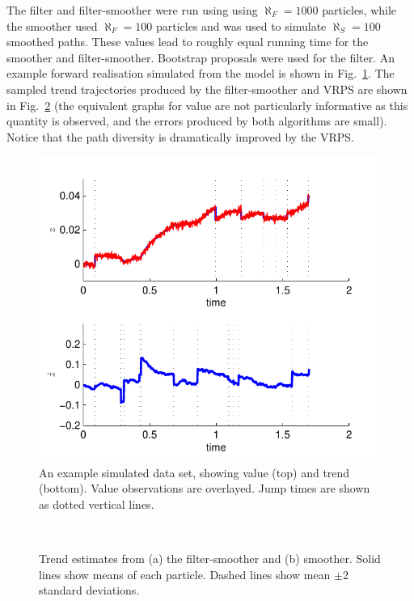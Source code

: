 \documentclass[peerreview,11pt,draftcls,onecolumn]{IEEEtran}
\begin{document}
The filter and filter-smoother were run using using $\aleph_F = 1000$ particles, while the smoother used $\aleph_F = 100$ particles and was used to simulate $\aleph_S = 100$ smoothed paths. These values lead to roughly equal running time for the smoother and filter-smoother. Bootstrap proposals were used for the filter. An example forward realisation simulated from the model is shown in Fig.~\ref{fig:example_data}. The sampled trend trajectories produced by the filter-smoother and VRPS are shown in Fig.~\ref{fig:example_state} (the equivalent graphs for value are not particularly informative as this quantity is observed, and the errors produced by both algorithms are small). Notice that the path diversity is dramatically improved by the VRPS.
%
\begin{figure}[!t]
\centering
\includegraphics[width=0.45\columnwidth]{example_data.pdf}
\caption{An example simulated data set, showing value (top) and trend (bottom). Value observations are overlayed. Jump times are shown as dotted vertical lines.}
\label{fig:example_data}
\end{figure}
%
\begin{figure}[!t]
\centering
{} \\
\caption{Trend estimates from (a) the filter-smoother and (b) smoother. Solid lines show means of each particle. Dashed lines show mean $\pm$2 standard deviations.}
\label{fig:example_state}
\end{figure}
\end{document}
